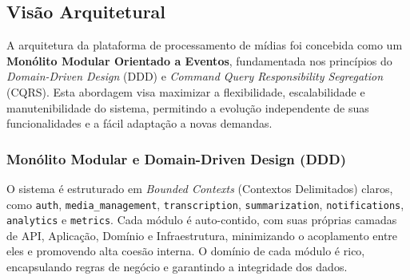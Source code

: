 \subsection{Visão Arquitetural}
\label{sec:arquitetura}

A arquitetura da plataforma de processamento de mídias foi concebida como um \textbf{Monólito Modular Orientado a Eventos}, fundamentada nos princípios do \textit{Domain-Driven Design} (DDD) e \textit{Command Query Responsibility Segregation} (CQRS). Esta abordagem visa maximizar a flexibilidade, escalabilidade e manutenibilidade do sistema, permitindo a evolução independente de suas funcionalidades e a fácil adaptação a novas demandas.

\subsubsection{Monólito Modular e Domain-Driven Design (DDD)}
O sistema é estruturado em \textit{Bounded Contexts} (Contextos Delimitados) claros, como \texttt{auth}, \texttt{media\_management}, \texttt{transcription}, \texttt{summarization}, \texttt{notifications}, \texttt{analytics} e \texttt{metrics}. Cada módulo é auto-contido, com suas próprias camadas de API, Aplicação, Domínio e Infraestrutura, minimizando o acoplamento entre eles e promovendo alta coesão interna. O domínio de cada módulo é rico, encapsulando regras de negócio e garantindo a integridade dos dados.


